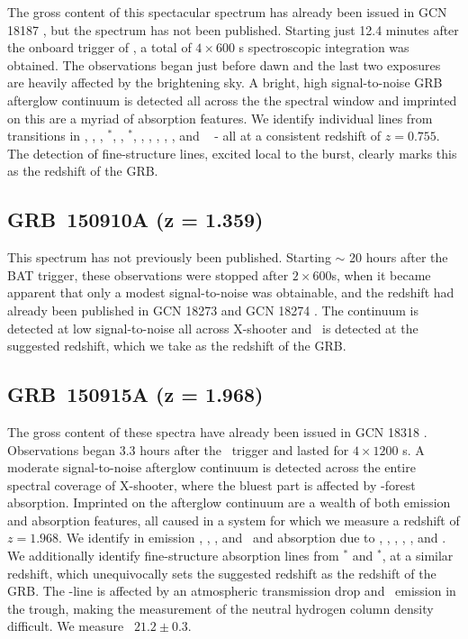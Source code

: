 \documentclass[longauth]{aa}    %
\begin{document}
The gross content of this spectacular spectrum has already been issued in GCN
18187 \citep{GCN18187}, but the spectrum has not been published. Starting just
12.4 minutes after the onboard trigger of \swift, a total of $4 \times 600$ s
spectroscopic integration was obtained. The observations began just before dawn
and the last two exposures are heavily affected by the brightening sky. A
bright, high signal-to-noise GRB afterglow continuum is detected all across the
the spectral window and imprinted on this are a myriad of absorption features.
We identify individual lines from transitions in \aliii, \crii, \znii,
\NIii$^*$, \feii, \feii$^*$, \scii, \mnii, \mgii, \mgi, \TIii, and  \caii~ - all
at a consistent redshift of $z = 0.755$. The detection of fine-structure lines,
excited local to the burst, clearly marks this as the redshift of the GRB.

\subsection{GRB~150910A (z = 1.359)}\label{150910}

This spectrum has not previously been published. Starting $\sim$ 20 hours after
the BAT trigger, these observations were stopped after $2 \times 600$s, when it
became apparent that only a modest signal-to-noise was obtainable, and the
redshift had already been published in GCN 18273 \citep{GCN18273} and GCN 18274
\citep{GCN18274}. The continuum is detected at low signal-to-noise all across
X-shooter and \mgii~is detected at the suggested redshift, which we take as the
redshift of the GRB.

\subsection{GRB~150915A (z = 1.968)}\label{150915}

The gross content of these spectra have already been issued in GCN 18318
\citep{GCN18318}. Observations began 3.3 hours after the \swift~trigger and
lasted for $4 \times 1200$ s. A moderate signal-to-noise afterglow continuum is
detected across the entire spectral coverage of X-shooter, where the
bluest part is affected by \lya-forest absorption. Imprinted on the afterglow
continuum are a wealth of both emission and absorption features, all caused in a
system for which we measure a redshift of $z = 1.968$. We identify in emission
\oii, \hb, \oiii, and \ha~and absorption due to \lya, \civ, \alii, \SIii, \feii,
and \mgii. We additionally identify fine-structure absorption lines from
\SIii$^*$ and \feii$^*$, at a similar redshift, which unequivocally sets the
suggested redshift as the redshift of the GRB. The \lya-line is affected by an
atmospheric transmission drop and \lya~emission in the trough, making the
measurement of the neutral hydrogen column density difficult. We measure
\nh~$21.2 \pm 0.3$.
\end{document}
